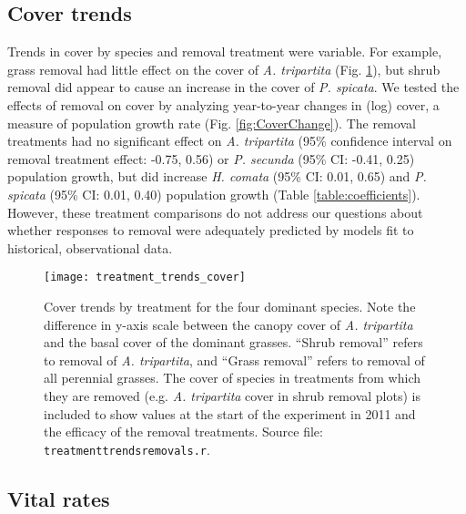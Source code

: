 \documentclass[11pt]{article}
\begin{document}
\begin{doublespacing}
\subsection*{Cover trends}

Trends in cover by species and removal treatment were variable. For example, grass removal had little effect on the cover of \textit{A. tripartita} 
(Fig. \ref{fig:CoverTrends}), but shrub removal did appear to cause an increase in the cover of \textit{P. spicata}. 
We tested the effects of removal on cover by analyzing year-to-year changes in (log) cover, a measure of population growth rate (Fig. \ref{fig:CoverChange}). The removal treatments had no significant effect on 
\textit{A. tripartita} (95\% confidence interval on removal treatment effect: -0.75, 0.56) or 
\textit{P. secunda} (95\% CI: -0.41, 0.25) population growth, but did increase 
\textit{H. comata} (95\% CI: 0.01, 0.65) and
 \textit{P. spicata} (95\% CI: 0.01, 0.40) population growth 
(Table \ref{table:coefficients}). However, these treatment comparisons do not address our questions about whether responses to removal were 
adequately predicted by models fit to historical, observational data. 

\begin{figure}[tbp]
\centering
\texttt{[image: treatment\_trends\_cover]}
\caption{Cover trends by treatment for the four dominant species.  Note the difference in y-axis scale between the canopy cover of \textit{A. tripartita} and the basal cover of the dominant grasses. ``Shrub removal'' refers to removal of \textit{A. tripartita}, and ``Grass removal'' refers to removal of all perennial grasses. The cover of species in treatments from which they are removed (e.g. \textit{A. tripartita} cover in shrub removal plots) is included to show values at the start of the experiment in 2011 and the efficacy of the removal treatments. Source file: \texttt{treatment\textunderscore trends\textunderscore removals.r}.}
\label{fig:CoverTrends}
\end{figure}


\subsection*{Vital rates}


\end{doublespacing}
\end{document}
